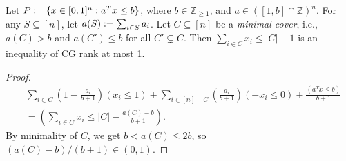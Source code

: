 \documentclass[a4paper,12pt,fleqn]{article}
\begin{document}
\begin{theorem}
Let $P := \{x \in [0, 1]^n: a^Tx \le b\}$,
where $b \in \mathbb{Z}_{\ge 1}$, and $a \in ([1, b] \cap \mathbb{Z})^n$.
For any $S \subseteq [n]$, let $a(S) := \sum_{i \in S} a_i$.
Let $C \subseteq [n]$ be a \emph{minimal cover},
i.e., $a(C) > b$ and $a(C') \le b$ for all $C' \subsetneq C$.
Then $\sum_{i \in C} x_i \le |C|-1$ is an inequality of CG rank at most 1.
\end{theorem}
\begin{proof}
\begin{align*}
& \sum_{i \in C} \left(1 - \frac{a_i}{b+1}\right)(x_i \le 1)
    + \sum_{i \in [n]-C} \left(\frac{a_i}{b+1}\right)(-x_i \le 0)
    + \frac{(a^Tx \le b)}{b+1}
\\ &= \left(\sum_{i \in C} x_i \le |C| - \frac{a(C)-b}{b+1}\right).
\end{align*}
By minimality of $C$, we get $b < a(C) \le 2b$,
so $(a(C)-b)/(b+1) \in (0, 1)$.
\end{proof}



\end{document}
